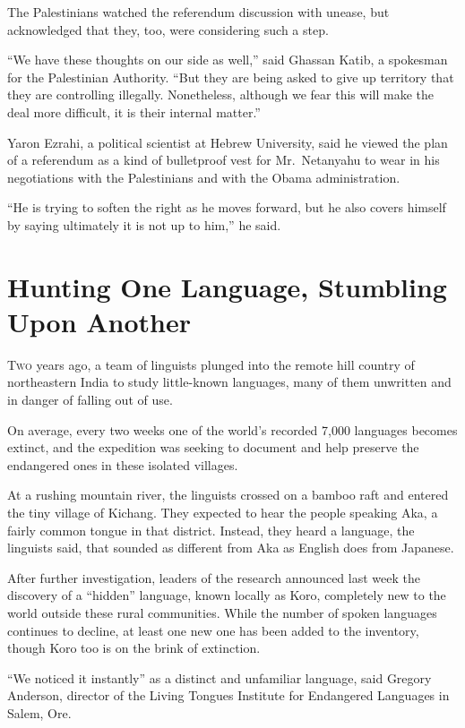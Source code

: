 ﻿\documentclass[12pt]{article}
\begin{document}
The Palestinians watched the referendum discussion with unease, but acknowledged that they, too,
were considering such a step.

``We have these thoughts on our side as well,'' said Ghassan Katib, a spokesman for the Palestinian
Authority. ``But they are being asked to give up territory that they are controlling illegally.
Nonetheless, although we fear this will make the deal more difficult, it is their internal matter.''

Yaron Ezrahi, a political scientist at Hebrew University, said he viewed the plan of a referendum as
a kind of bulletproof vest for Mr.~Netanyahu to wear in his negotiations with the Palestinians and
with the Obama administration.

``He is trying to soften the right as he moves forward, but he also covers himself by saying
ultimately it is not up to him,'' he said.

\section{Hunting One Language, Stumbling Upon Another}

\lettrine{T}{wo} years ago, a team of linguists plunged into the remote hill
country of northeastern India to study little-known languages, many of them unwritten and in danger
of falling out of use.

On average, every two weeks one of the world's recorded 7,000 languages becomes extinct, and the
expedition was seeking to document and help preserve the endangered ones in these isolated villages.

At a rushing mountain river, the linguists crossed on a bamboo raft and entered the tiny village of
Kichang. They expected to hear the people speaking Aka, a fairly common tongue in that district.
Instead, they heard a language, the linguists said, that sounded as different from Aka as English
does from Japanese.

After further investigation, leaders of the research announced last week the discovery of a
``hidden'' language, known locally as Koro, completely new to the world outside these rural
communities. While the number of spoken languages continues to decline, at least one new one has
been added to the inventory, though Koro too is on the brink of extinction.

``We noticed it instantly'' as a distinct and unfamiliar language, said Gregory Anderson, director
of the Living Tongues Institute for Endangered Languages in Salem, Ore.
\end{document}
